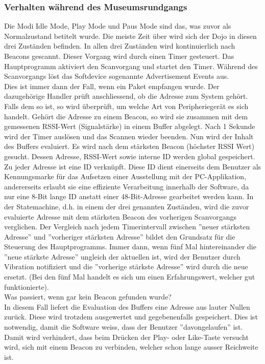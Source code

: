 \subsubsection{Verhalten während des Museumsrundgangs}
Die Modi Idle Mode, Play Mode und Paus Mode sind das, was zuvor als Normalzustand betitelt wurde. Die meiste Zeit über wird sich der Dojo in diesen drei Zuständen befinden.
In allen drei Zuständen wird kontinuierlich nach Beacons gescannt. Dieser Vorgang wird durch einen Timer gesteuert. Das Hauptprogramm aktiviert den Scanvorgang und startet den Timer. Während des Scanvorgangs löst das Softdevice sogenannte Advertisement Events aus.\\ Dies ist immer dann der Fall, wenn ein Paket empfangen wurde. Der dazugehörige Handler prüft anschliessend, ob die Adresse zum System gehört. Falls dem so ist, so wird überprüft, um welche Art von Peripheriegerät es sich handelt. Gehört die Adresse zu einem Beacon, so wird sie zusammen mit dem gemessenen RSSI-Wert (Signalstärke) in einem Buffer abgelegt. Nach 1 Sekunde wird der Timer auslösen und das Scannen wieder beenden. Nun wird der Inhalt des Buffers evaluiert. Es wird nach dem stärksten Beacon (höchster RSSI Wert) gesucht. Dessen Adresse, RSSI-Wert sowie interne ID werden global gespeichert.\\ Zu jeder Adresse ist eine ID verknüpft. Diese ID dient einerseits dem Benutzer als Kennungsmarke für das Aufsetzen einer Ausstellung mit der PC-Applikation, andererseits erlaubt sie eine effiziente Verarbeitung innerhalb der Software, da nur eine 8-Bit lange ID anstatt einer 48-Bit-Adresse gearbeitet werden kann.
In der Statemachine, d.h. in einem der drei genannten Zuständen, wird die zuvor evaluierte Adresse mit dem stärksten Beacon des vorherigen Scanvorgangs verglichen. Der Vergleich nach jedem Timerintervall zwischen ''neuer stärksten Adresse'' und ''vorheriger stärksten Adresse'' bildet den Grundsatz für die Steuerung des Hauptprogramms. Immer dann, wenn fünf Mal hintereinander die ''neue stärkste Adresse'' ungleich der aktuellen ist, wird der Benutzer durch Vibration notifiziert und die ''vorherige stärkste Adresse'' wird durch die neue ersetzt. (Bei den fünf Mal handelt es sich um einen Erfahrungswert, welcher gut funktionierte).\\
Was passiert, wenn gar kein Beacon gefunden wurde? \\In diesem Fall liefert die Evaluation des Buffers eine Adresse aus lauter Nullen zurück. Diese wird trotzdem ausgewertet und gegebenenfalls gespeichert. Dies ist notwendig, damit die Software weiss, dass der Benutzer ''davongelaufen'' ist. Damit wird verhindert, dass beim Drücken der Play- oder Like-Taste versucht wird, sich mit einem Beacon zu verbinden, welcher schon lange ausser Reichweite ist.
